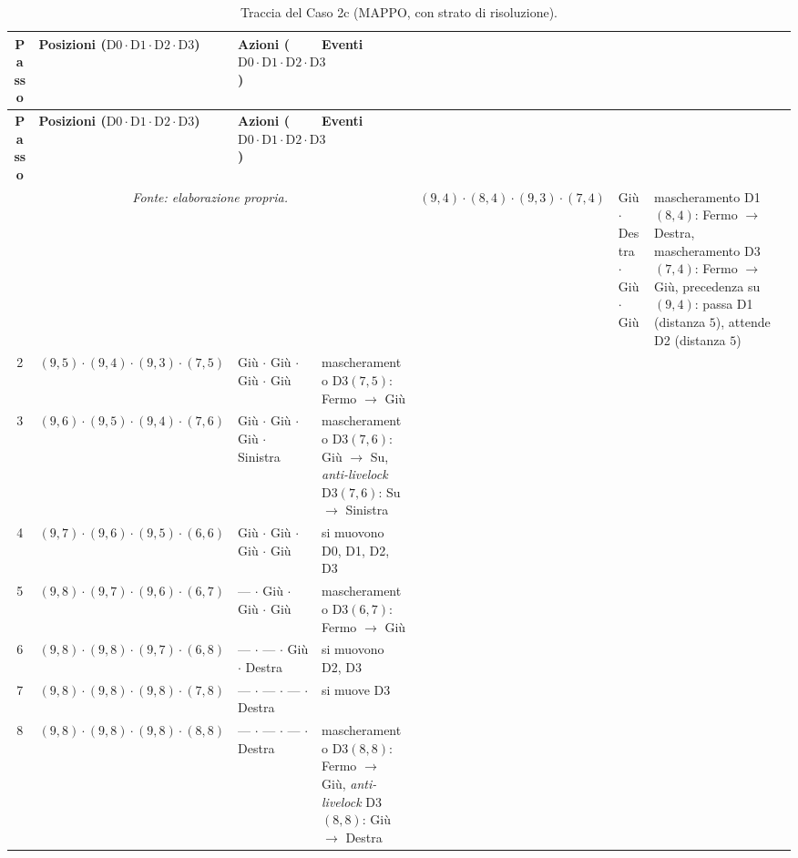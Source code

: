 \documentclass[12pt,a4paper,twoside]{report}
\begin{document}
{\footnotesize
\setlength{\tabcolsep}{3.5pt}
\begin{longtable}{c l l >{\raggedright\arraybackslash}p{3.8cm}}
\caption{Traccia del Caso 2c (MAPPO, con strato di risoluzione).}\\
\toprule
\textbf{Passo} & \textbf{Posizioni ($\text{D0} \cdot \text{D1} \cdot \text{D2} \cdot \text{D3}$)} & \textbf{Azioni ($\text{D0} \cdot \text{D1} \cdot \text{D2} \cdot \text{D3}$)} & \textbf{Eventi} \\
\midrule
\endfirsthead
\toprule
\textbf{Passo} & \textbf{Posizioni ($\text{D0} \cdot \text{D1} \cdot \text{D2} \cdot \text{D3}$)} & \textbf{Azioni ($\text{D0} \cdot \text{D1} \cdot \text{D2} \cdot \text{D3}$)} & \textbf{Eventi} \\
\midrule
\endhead
\bottomrule
\multicolumn{4}{c}{\footnotesize\emph{Fonte: elaborazione propria.}}
\endlastfoot
1 & $(9, 4) \cdot (8, 4) \cdot (9, 3) \cdot (7, 4)$ & Giù $\cdot$ Destra $\cdot$ Giù $\cdot$ Giù   & mascheramento D1$(8, 4)$: Fermo $\to$ Destra, mascheramento D3$(7, 4)$: Fermo $\to$ Giù, precedenza su $(9, 4)$: passa D1 (distanza $5$), attende D2 (distanza $5$) \\
2 & $(9, 5) \cdot (9, 4) \cdot (9, 3) \cdot (7, 5)$ & Giù $\cdot$ Giù $\cdot$ Giù $\cdot$ Giù      & mascheramento D3$(7, 5)$: Fermo $\to$ Giù \\
3 & $(9, 6) \cdot (9, 5) \cdot (9, 4) \cdot (7, 6)$ & Giù $\cdot$ Giù $\cdot$ Giù $\cdot$ Sinistra & mascheramento D3$(7, 6)$: Giù $\to$ Su, \emph{anti-livelock} D3$(7, 6)$: Su $\to$ Sinistra \\
4 & $(9, 7) \cdot (9, 6) \cdot (9, 5) \cdot (6, 6)$ & Giù $\cdot$ Giù $\cdot$ Giù $\cdot$ Giù      & si muovono D0, D1, D2, D3 \\
5 & $(9, 8) \cdot (9, 7) \cdot (9, 6) \cdot (6, 7)$ & --- $\cdot$ Giù $\cdot$ Giù $\cdot$ Giù      & mascheramento D3$(6, 7)$: Fermo $\to$ Giù \\
6 & $(9, 8) \cdot (9, 8) \cdot (9, 7) \cdot (6, 8)$ & --- $\cdot$ --- $\cdot$ Giù $\cdot$ Destra   & si muovono D2, D3 \\
7 & $(9, 8) \cdot (9, 8) \cdot (9, 8) \cdot (7, 8)$ & --- $\cdot$ --- $\cdot$ --- $\cdot$ Destra   & si muove D3 \\*
8 & $(9, 8) \cdot (9, 8) \cdot (9, 8) \cdot (8, 8)$ & --- $\cdot$ --- $\cdot$ --- $\cdot$ Destra   & mascheramento D3$(8, 8)$: Fermo $\to$ Giù, \emph{anti-livelock} D3$(8, 8)$: Giù $\to$ Destra \\*
\end{longtable}
}
\end{document}
